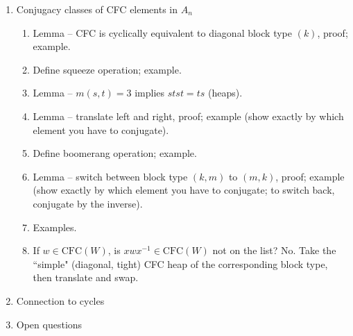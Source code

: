 \documentclass{article}
\begin{document}
\begin{enumerate}
\item Conjugacy classes of CFC elements in $A_n$ \begin{enumerate}
	\item Lemma -- CFC is cyclically equivalent to diagonal block type $(k)$, proof; example.
	\item Define squeeze operation; example.
	\item Lemma -- $m(s,t) = 3$ implies $stst = ts$ (heaps).
	\item Lemma -- translate left and right, proof; example (show exactly by which element you have to conjugate).
	\item Define boomerang operation; example.
	\item Lemma -- switch between block type $(k,m)$ to $(m,k)$, proof; example (show exactly by which element you have to conjugate; to switch back, conjugate by the inverse).
	\item Examples.
	\item If $w \in \text{CFC}(W)$, is $xwx^{-1} \in \text{CFC}(W)$ not on the list? No. Take the ``simple" (diagonal, tight) CFC heap of the corresponding block type, then translate and swap.
\end{enumerate}

\item Connection to cycles

\item Open questions

\end{enumerate}
\end{document}
